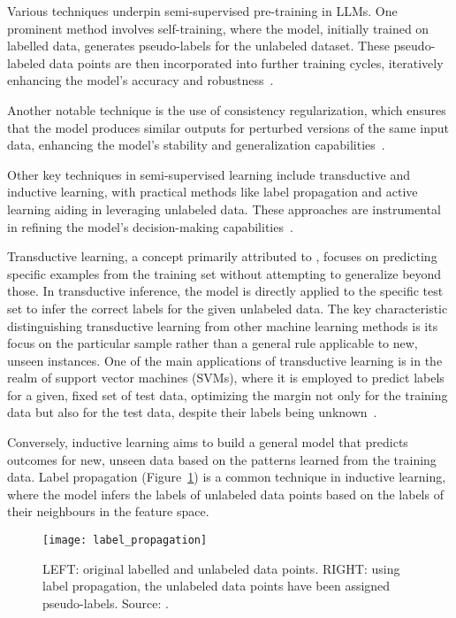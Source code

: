 Various techniques underpin semi-supervised pre-training in LLMs. One prominent method involves self-training, where the model, initially trained on labelled data, generates pseudo-labels for the unlabeled dataset.
These pseudo-labeled data points are then incorporated into further training cycles, iteratively enhancing the model's accuracy and robustness~\cite{lee2013pseudo}.

Another notable technique is the use of consistency regularization, which ensures that the model produces similar outputs for perturbed versions of the same input data, enhancing the model's stability and generalization capabilities~\cite{sajjadi2016regularization}.

Other key techniques in semi-supervised learning include transductive and inductive learning, with practical methods like label propagation and active learning aiding in leveraging unlabeled data.
These approaches are instrumental in refining the model's decision-making capabilities~\cite{bergmann2023semi}.

Transductive learning, a concept primarily attributed to \textcite{vapnik1998statistical}, focuses on predicting specific examples from the training set without attempting to generalize beyond those.
In transductive inference, the model is directly applied to the specific test set to infer the correct labels for the given unlabeled data.
The key characteristic distinguishing transductive learning from other machine learning methods is its focus on the particular sample rather than a general rule applicable to new, unseen instances.
One of the main applications of transductive learning is in the realm of support vector machines (SVMs), where it is employed to predict labels for a given, fixed set of test data, optimizing the margin not only for the training data but also for the test data, despite their labels being unknown~\cite{joachims1999transductive}.

Conversely, inductive learning aims to build a general model that predicts outcomes for new, unseen data based on the patterns learned from the training data.
Label propagation (Figure~\ref{fig:label_propagation}) is a common technique in inductive learning, where the model infers the labels of unlabeled data points based on the labels of their neighbours in the feature space.

\begin{figure}[h]
	\centering
	\texttt{[image: label\_propagation]}
	\caption{LEFT: original labelled and unlabeled data points. RIGHT: using label propagation, the unlabeled data points have been assigned pseudo-labels. Source: \textcite{bergmann2023semi}.}
	\label{fig:label_propagation}
\end{figure}

